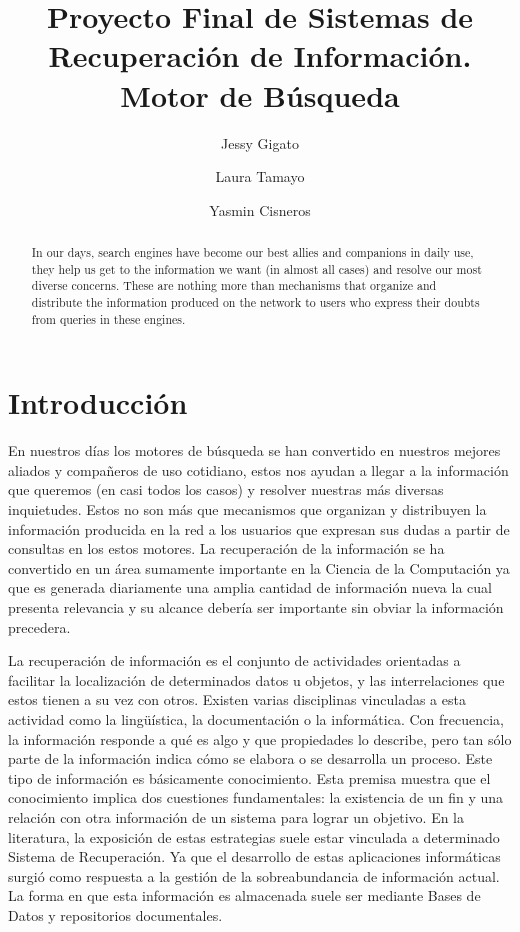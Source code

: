\documentclass[runningheads]{llncs}
\begin{document}
\title{Proyecto Final de Sistemas de Recuperación de Información. Motor de Búsqueda}

\author{Jessy Gigato  \and 
Laura Tamayo \and 
Yasmin Cisneros}
\maketitle
\begin{abstract}
	In our days, search engines have become our best allies and companions in daily use, they help us get to the information we want (in almost all cases) and resolve our most diverse concerns. These are nothing more than mechanisms that organize and distribute the information produced on the network to users who express their doubts from queries in these engines.
\end{abstract}

\section*{Introducción}


En nuestros días los motores de búsqueda se han convertido en nuestros mejores aliados y compañeros de uso cotidiano, estos nos ayudan a llegar a la información que queremos (en casi todos los casos) y resolver nuestras más diversas inquietudes. Estos no son más que mecanismos que organizan y distribuyen la información producida en la red a los usuarios que expresan sus dudas a partir de consultas en los estos motores. La recuperación de la información se ha convertido en un área sumamente importante en la Ciencia de la Computación ya que es generada diariamente una amplia cantidad de información nueva la cual presenta relevancia y su alcance debería ser importante sin obviar la información precedera.

La recuperación de información es el conjunto de actividades orientadas a facilitar la localización de determinados datos u objetos, y las interrelaciones que estos tienen a su vez con otros. Existen varias disciplinas vinculadas a esta actividad como la lingüística, la documentación o la informática. Con frecuencia, la información responde a qué es algo y que propiedades lo describe, pero tan sólo parte de la información indica cómo se elabora o se desarrolla un proceso. Este tipo de información es básicamente  conocimiento. Esta premisa muestra que el conocimiento implica dos cuestiones fundamentales: la existencia de un fin y una relación con otra información de un sistema para lograr un objetivo. En la literatura, la exposición de estas estrategias suele estar vinculada a determinado Sistema de Recuperación. Ya que el desarrollo de estas aplicaciones informáticas surgió como respuesta a la gestión de la sobreabundancia de información actual. La forma en que esta información es almacenada suele ser mediante Bases de Datos y repositorios documentales.
\end{document}
